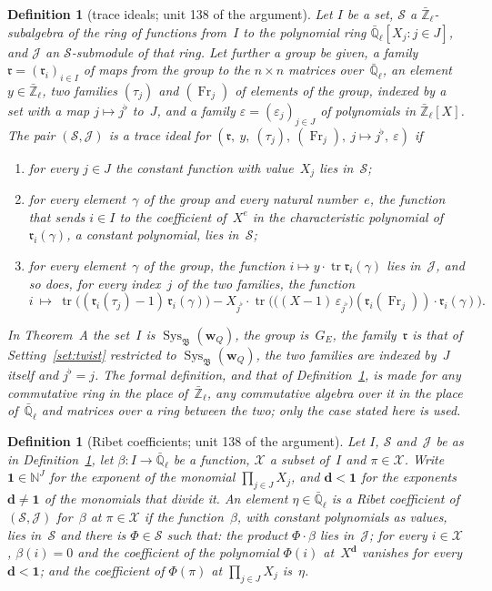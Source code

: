 \documentclass[11pt,a4paper]{article}
\newcommand{\kw}[1]{\emph{#1}}
\newcommand{\m}[1]{\mbox{$#1$}}        %
\theoremstyle{plainx}
\theoremstyle{uprightx}
\newtheorem{definition}[theorem]{Definition}
\newcommand{\NN}{\mathbb{N}}
\newcommand{\Zl}{\bar{\mathbb{Z}}_\ell}
\newcommand{\Ql}{\bar{\mathbb{Q}}_\ell}
\newcommand{\GE}{G_E}
\newcommand{\tr}{\operatorname{tr}}
\newcommand{\Sys}{\operatorname{Sys}}
\newcommand{\fB}{\mathfrak{B}}
\newcommand{\rr}{\mathfrak{r}}
\newcommand{\bw}{\mathbf{w}}
\newcommand{\bd}{\mathbf{d}}
\newcommand{\one}{\mathbf{1}}
\newcommand{\Fr}{\operatorname{Fr}}
\newcommand{\cS}{\mathcal{S}}
\newcommand{\cJ}{\mathcal{J}}
\newcommand{\cX}{\mathcal{X}}
\newcommand{\SQ}{\Sys_{\fB}(\bw_Q)}
\begin{document}
\begin{definition}[trace ideals; unit 138 of the argument]\label{d:ideal}
Let $I$ be a set, $\cS$ a $\Zl$-subalgebra of the ring of functions from~$I$ to the polynomial ring
\m{\Ql[X_j:j\in J]}, and $\cJ$ an $\cS$-submodule of that ring. Let further a group be given, a family
\m{\rr=(\rr_i)_{i\in I}} of maps from the group to the \m{n\times n} matrices over~$\Ql$, an element \m{y\in\Zl},
two families \m{(\tau_j)} and \m{(\Fr_j)} of elements of the group, indexed by a set with a map
\m{j\mapsto j^{\flat}} to~$J$, and a family \m{\varepsilon=(\varepsilon_j)_{j\in J}} of polynomials in \m{\Zl[X]}.
The pair \m{(\cS,\cJ)} is a \kw{trace ideal for} \m{(\rr,\ y,\ (\tau_j),\ (\Fr_j),\ j\mapsto j^{\flat},\ \varepsilon)} if
\begin{enumerate}[label=\textup{(\alph*)},leftmargin=2.3em,itemsep=2pt]
\item for every \m{j\in J} the constant function with value~$X_j$ lies in~$\cS$;
\item for every element~$\gamma$ of the group and every natural number~$e$, the function that sends \m{i\in I} to
the coefficient of~$X^{e}$ in the characteristic polynomial of \m{\rr_i(\gamma)}, a constant polynomial, lies
in~$\cS$;
\item for every element~$\gamma$ of the group, the function \m{i\mapsto y\cdot\tr\rr_i(\gamma)} lies in~$\cJ$, and
so does, for every index~$j$ of the two families, the function
\[i\ \longmapsto\ \tr\bigl((\rr_i(\tau_j)-1)\,\rr_i(\gamma)\bigr)-X_{j^{\flat}}\cdot
\tr\bigl(\bigl((X-1)\,\varepsilon_{j^{\flat}}\bigr)(\rr_i(\Fr_j))\cdot\rr_i(\gamma)\bigr).\]
\end{enumerate}
In Theorem~A the set~$I$ is \m{\SQ}, the group is~$\GE$, the family~$\rr$ is that of Setting~\ref{set:twist}
restricted to \m{\SQ}, the two families are indexed by~$J$ itself and \m{j^{\flat}=j}. The formal definition, and
that of Definition~\ref{d:ribet}, is made for any commutative ring in the place of~$\Zl$, any commutative algebra
over it in the place of~$\Ql$ and matrices over a ring between the two; only the case stated here is used.
\end{definition}

\begin{definition}[Ribet coefficients; unit 138 of the argument]\label{d:ribet}
Let $I$, $\cS$ and~$\cJ$ be as in Definition~\ref{d:ideal}, let \m{\beta\colon I\to\Ql} be a function, $\cX$ a
subset of~$I$ and \m{\pi\in\cX}. Write \m{\one\in\NN^J} for the exponent of the monomial \m{\prod_{j\in J}X_j}, and
\m{\bd<\one} for the exponents \m{\bd\ne\one} of the monomials that divide it. An element \m{\eta\in\Ql} is a
\kw{Ribet coefficient of \m{(\cS,\cJ)} for~$\beta$ at \m{\pi\in\cX}} if the function~$\beta$, with constant
polynomials as values, lies in~$\cS$ and there is \m{\Phi\in\cS} such that: the product \m{\Phi\cdot\beta} lies
in~$\cJ$; for every \m{i\in\cX}, \m{\beta(i)=0} and the coefficient of the polynomial \m{\Phi(i)} at~$X^{\bd}$
vanishes for every \m{\bd<\one}; and the coefficient of \m{\Phi(\pi)} at \m{\prod_{j\in J}X_j} is~$\eta$.
\end{definition}
\end{document}

